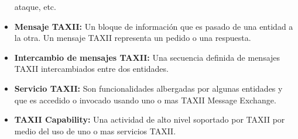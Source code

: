 \begin{itemize}
  ataque, etc.
 \item \textbf{Mensaje TAXII:} Un bloque de información que es pasado de una entidad a la 
 otra. Un mensaje TAXII representa un pedido o una respuesta.
 \item \textbf{Intercambio de mensajes TAXII:} Una secuencia definida de mensajes TAXII 
 intercambiados entre dos entidades.
\item \textbf{Servicio TAXII:} Son funcionalidades albergadas por algunas entidades y que 
es accedido o invocado usando uno o mas TAXII Message Exchange.
\item \textbf{TAXII Capability:} Una actividad de alto nivel soportado por TAXII por 
medio del uso de uno o mas servicios TAXII.
\end{itemize}
\newpage
